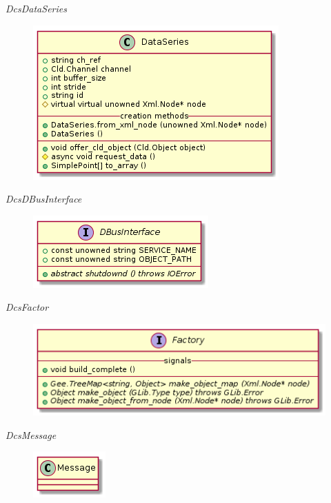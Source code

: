       \emph{DcsDataSeries}

        \begin{figure}[H]
          \includegraphics{figures/design/class/core/dataseries}
        \end{figure}

      \emph{DcsDBusInterface}

        \begin{figure}[H]
          \includegraphics{figures/design/class/core/dbus-interface}
        \end{figure}

      \emph{DcsFactor}

        \begin{figure}[H]
          \includegraphics{figures/design/class/core/factory}
        \end{figure}

      \emph{DcsMessage}

        \begin{figure}[H]
          \includegraphics{figures/design/class/core/message}
        \end{figure}


